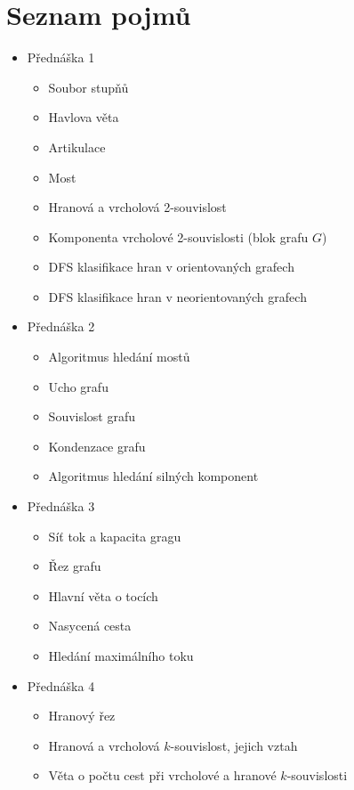 \section{Seznam pojmů}

\begin{itemize}
    \item Přednáška 1
    \begin{itemize}
        \item Soubor stupňů
        \item Havlova věta
        \item Artikulace
        \item Most
        \item Hranová a vrcholová 2-souvislost
        \item Komponenta vrcholové 2-souvislosti (blok grafu $G$)
        \item DFS klasifikace hran v orientovaných grafech
        \item DFS klasifikace hran v neorientovaných grafech
    \end{itemize}

    \item Přednáška 2
    \begin{itemize}
        \item Algoritmus hledání mostů
        \item Ucho grafu
        \item Souvislost grafu
        \item Kondenzace grafu
        \item Algoritmus hledání silných komponent
    \end{itemize}

    \item Přednáška 3
    \begin{itemize}
        \item Síť tok a kapacita gragu
        \item Řez grafu
        \item Hlavní věta o tocích
        \item Nasycená cesta
        \item Hledání maximálního toku
    \end{itemize}

    \item Přednáška 4
    \begin{itemize}
        \item Hranový řez
        \item Hranová a vrcholová $k$-souvislost, jejich vztah
        \item Věta o počtu cest při vrcholové a hranové $k$-souvislosti
    \end{itemize}


\end{itemize}
